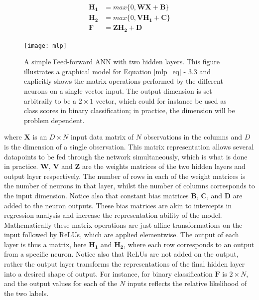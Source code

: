 \documentclass[12pt]{report}
\begin{document}
\begin{align} \label{mlp_eq}
  \mathbf{H_1} &= max\{0, \mathbf{W}\mathbf{X} + \mathbf{B}\} \\
  \mathbf{H_2} &= max\{0, \mathbf{V}\mathbf{H_1} + \mathbf{C}\} \\ 
  \mathbf{F} &= \mathbf{Z} \mathbf{H_{2}} + \mathbf{D} 
\end{align}

\begin{figure}
  \centering
	\texttt{[image: mlp]}
	\caption{A simple Feed-forward ANN with two hidden layers. This figure illustrates a graphical model for Equation \ref{mlp_eq} - 3.3 and explicitly shows the matrix operations performed by the different neurons on a single vector input. The output dimension is set arbitraily to be a $2\times1$ vector, which could for instance be used as class scores in binary classification; in practice, the dimension will be problem dependent.}
	\label{fig:mlp}
\end{figure}

where $\mathbf{X}$ is an $D\times N$ input data matrix of $N$ observations in the columns and $D$ is the dimension of a single observation. This matrix representation allows several datapoints to be fed through the network simultaneously, which is what is done in practice. $\mathbf{W}$, $\mathbf{V}$ and $\mathbf{Z}$ are the weights matrices of the two hidden layers and output layer respectively. The number of rows in each of the weight matrices is the number of neurons in that layer, whilst the number of columns corresponds to the input dimension. Notice also that constant bias matrices $\mathbf{B}$, $\mathbf{C}$, and $\mathbf{D}$ are added to the neuron outputs. These bias matrices are akin to intercepts in regression analysis and increase the representation ability of the model. Mathematically these matrix operations are just affine transformations on the input followed by ReLUs, which are applied elementwise. The output of each layer is thus a matrix, here $\mathbf{H_1}$ and $\mathbf{H_2}$, where each row corresponds to an output from a specific neuron. Notice also that ReLUs are not added on the output, rather the output layer transforms the representations of the final hidden layer into a desired shape of output. For instance, for binary classification $\mathbf{F}$ is $2 \times N$, and the output values for each of the $N$ inputs reflects the relative likelihood of the two labels.
\end{document}
